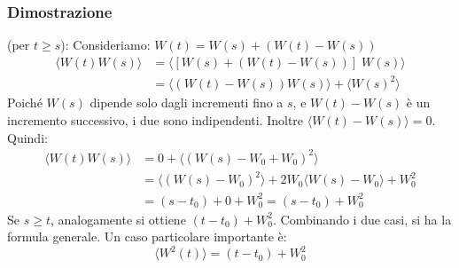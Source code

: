 \subsubsection{Dimostrazione} (per $t \ge s$):
Consideriamo: $W(t) = W(s) + (W(t)-W(s))$
\begin{equation}
\begin{aligned}
\langle {W(t)W(s)} \rangle &= \langle  {[W(s) + (W(t)-W(s))] \;W(s)}\rangle \\
&=  \langle {(W(t)-W(s))W(s)}\rangle + \langle {W(s)^2} \rangle
\end{aligned}
\end{equation}
Poiché $W(s)$ dipende solo dagli incrementi fino a $s$, e $W(t)-W(s)$ è un incremento successivo, i due sono indipendenti. Inoltre $\langle {W(t)-W(s)}\rangle = 0$.
Quindi:
\begin{equation}
\begin{aligned}
\langle W(t)W(s) \rangle &= 0  + \langle (W(s)-W_0+W_0)^2 \rangle \\
&= \langle (W(s)-W_0)^2 \rangle + 2W_0\langle W(s)-W_0 \rangle + W_0^2 \\
&= (s-t_0) + 0 + W_0^2 = (s-t_0) + W_0^2
\end{aligned}
\end{equation}
Se $s \ge t$, analogamente si ottiene $(t-t_0) + W_0^2$. Combinando i due casi, si ha la formula generale.
Un caso particolare importante è:
\begin{equation}
\langle W^2(t) \rangle = (t-t_0) + W_0^2
\end{equation}

